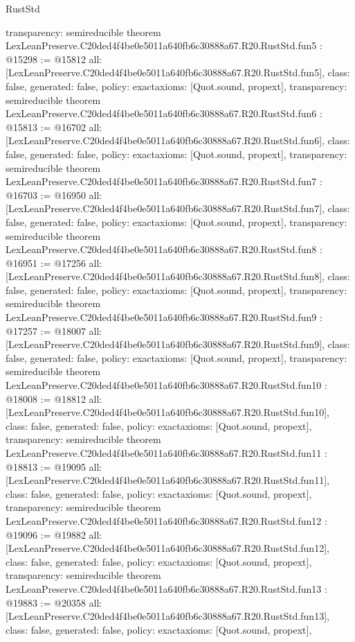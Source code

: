 \begin{lexlean}{RustStd}
\begin{coremodule}
{  transparency: semireducible
}
theorem LexLeanPreserve.C20ded4f4be0e5011a640fb6c30888a67.R20.RustStd.fun5 : @15298 := @15812 {
  all: [LexLeanPreserve.C20ded4f4be0e5011a640fb6c30888a67.R20.RustStd.fun5],
  class: false,
  generated: false,
  policy: exact{axioms: [Quot.sound, propext]},
  transparency: semireducible
}
theorem LexLeanPreserve.C20ded4f4be0e5011a640fb6c30888a67.R20.RustStd.fun6 : @15813 := @16702 {
  all: [LexLeanPreserve.C20ded4f4be0e5011a640fb6c30888a67.R20.RustStd.fun6],
  class: false,
  generated: false,
  policy: exact{axioms: [Quot.sound, propext]},
  transparency: semireducible
}
theorem LexLeanPreserve.C20ded4f4be0e5011a640fb6c30888a67.R20.RustStd.fun7 : @16703 := @16950 {
  all: [LexLeanPreserve.C20ded4f4be0e5011a640fb6c30888a67.R20.RustStd.fun7],
  class: false,
  generated: false,
  policy: exact{axioms: [Quot.sound, propext]},
  transparency: semireducible
}
theorem LexLeanPreserve.C20ded4f4be0e5011a640fb6c30888a67.R20.RustStd.fun8 : @16951 := @17256 {
  all: [LexLeanPreserve.C20ded4f4be0e5011a640fb6c30888a67.R20.RustStd.fun8],
  class: false,
  generated: false,
  policy: exact{axioms: [Quot.sound, propext]},
  transparency: semireducible
}
theorem LexLeanPreserve.C20ded4f4be0e5011a640fb6c30888a67.R20.RustStd.fun9 : @17257 := @18007 {
  all: [LexLeanPreserve.C20ded4f4be0e5011a640fb6c30888a67.R20.RustStd.fun9],
  class: false,
  generated: false,
  policy: exact{axioms: [Quot.sound, propext]},
  transparency: semireducible
}
theorem LexLeanPreserve.C20ded4f4be0e5011a640fb6c30888a67.R20.RustStd.fun10 : @18008 := @18812 {
  all: [LexLeanPreserve.C20ded4f4be0e5011a640fb6c30888a67.R20.RustStd.fun10],
  class: false,
  generated: false,
  policy: exact{axioms: [Quot.sound, propext]},
  transparency: semireducible
}
theorem LexLeanPreserve.C20ded4f4be0e5011a640fb6c30888a67.R20.RustStd.fun11 : @18813 := @19095 {
  all: [LexLeanPreserve.C20ded4f4be0e5011a640fb6c30888a67.R20.RustStd.fun11],
  class: false,
  generated: false,
  policy: exact{axioms: [Quot.sound, propext]},
  transparency: semireducible
}
theorem LexLeanPreserve.C20ded4f4be0e5011a640fb6c30888a67.R20.RustStd.fun12 : @19096 := @19882 {
  all: [LexLeanPreserve.C20ded4f4be0e5011a640fb6c30888a67.R20.RustStd.fun12],
  class: false,
  generated: false,
  policy: exact{axioms: [Quot.sound, propext]},
  transparency: semireducible
}
theorem LexLeanPreserve.C20ded4f4be0e5011a640fb6c30888a67.R20.RustStd.fun13 : @19883 := @20358 {
  all: [LexLeanPreserve.C20ded4f4be0e5011a640fb6c30888a67.R20.RustStd.fun13],
  class: false,
  generated: false,
  policy: exact{axioms: [Quot.sound, propext]},
}
\end{coremodule}
\end{lexlean}
